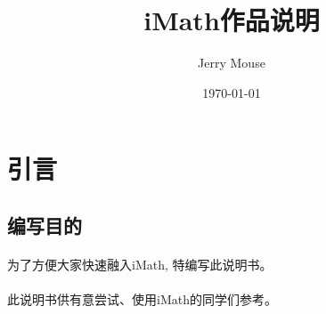 \documentclass[12pt,a4paper,titlepage]{article}
\title{iMath作品说明}
\author{Jerry Mouse}
\date{\today}
\begin{document}
\maketitle

\tableofcontents

\clearpage

\section{引言}

\subsection{编写目的}
\paragraph{}
 为了方便大家快速融入iMath, 特编写此说明书。
\paragraph{}
 此说明书供有意尝试、使用iMath的同学们参考。
\end{document}
